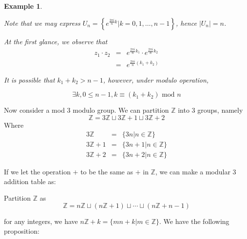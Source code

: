 \documentclass{article}
\theoremstyle{MyNonumberplain}
\theoremstyle{break}
\newcommand{\Z}{\mathbb{Z}}
\theoremstyle{break}
\newtheorem{example}{Example}[section]
\theoremstyle{break}
\theoremstyle{definition}
\theoremstyle{break}
\begin{document}
\begin{expbox}
\begin{example}
\begin{ansbox}
            Note that we may express $U_n = \left\{ e^{\frac{2 \pi i}{n} k} |k = 0, 1,
            \ldots, n - 1 \right\}$, hence $| U_n | = n$.\bigskip
    
            \hrulefill
    
            At the first glance, we observe that
            \begin{eqnarray*}
            z_1 \cdot z_2 & = & e^{\frac{2 \pi i}{n} k_1} \cdot e^{\frac{2 \pi i}{n}
            k_2}\\
            & = & e^{\frac{2 \pi i}{n} (k_1 + k_2)}
            \end{eqnarray*}
    
            It is possible that $k_1 + k_2 > n - 1$, however, under modulo operation,
    
            \[ \exists k, 0 \leq n - 1, k \equiv (k_1 + k_2) \text{ mod } n \]
    
        \end{ansbox}

    \end{example}
\end{expbox}

Now consider a mod 3 modulo group. We can partition $\Z$ into 3 groups, namely 
$$\Z=3\Z\sqcup 3\Z +1 \sqcup 3\Z +2$$
Where
\begin{eqnarray}
    3\Z & = & \{3n|n\in\Z\}\nonumber\\
    3\Z + 1 & = & \{3n + 1|n\in\Z\}\nonumber\\
    3\Z + 2 & = & \{3n + 2|n\in\Z\}\nonumber
\end{eqnarray}

If we let the operation $+$ to be the same as $+$ in $\Z$, we can make a modular 3 addition table as: 

\begin{center}
    {}
\end{center}

Partition $\Z$ as $$\mathbb{Z}= n\mathbb{Z} \sqcup (n\mathbb{Z}+ 1) \sqcup \cdots \sqcup
(n\mathbb{Z}+ n - 1)$$

for any integers, we have $n\Z+k=\{mn+k|m\in\Z\}$. We have the following proposition:
\end{document}

